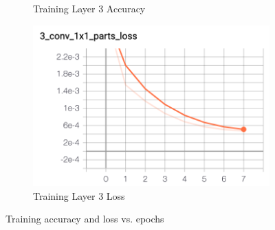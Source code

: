 \documentclass[11pt, letterpaper]{article}
\begin{document}
\begin{figure}[h]
\begin{subfigure}{0.4\textwidth}
        \caption{Training Layer 3 Accuracy}
    \end{subfigure}
    \begin{subfigure}{0.4\textwidth}
        \includegraphics[width=0.8\linewidth]{train_layer_3_loss.png}
        \caption{Training Layer 3 Loss}
    \end{subfigure}
    \caption{Training accuracy and loss vs. epochs}
    \label{fig:hg_4_train}
\end{figure}
\end{document}
